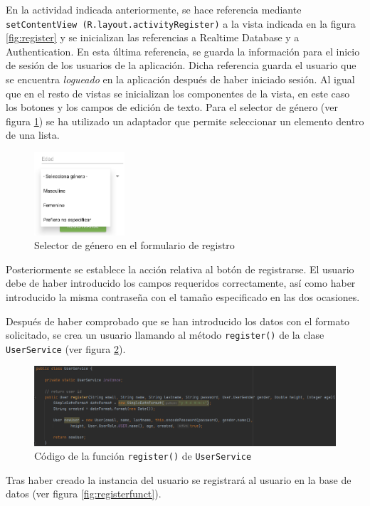 En la actividad indicada anteriormente, se hace referencia mediante \texttt{setContentView (R.layout.activityRegister)} a la vista indicada en la figura \ref{fig:register} y se inicializan las referencias a Realtime Database y a Authentication. En esta última referencia, se guarda la información para el inicio de sesión de los usuarios de la aplicación. Dicha referencia guarda el usuario que se encuentra \textit{logueado} en la aplicación después de haber iniciado sesión.
Al igual que en el resto de vistas se inicializan los componentes de la vista, en este caso los botones y los campos de edición de texto.
Para el selector de género (ver figura \ref{fig:selector}) se ha utilizado un adaptador que permite seleccionar un elemento dentro de una lista.
\begin{figure}[H]
    \centering
    \includegraphics[width=0.3\textwidth]{Images/Capitulo7/selector.png}
    \caption{Selector de género en el formulario de registro}
    \label{fig:selector}
\end{figure}
Posteriormente se establece la acción relativa al botón de registrarse. El usuario debe de haber introducido los campos requeridos correctamente, así como haber introducido la misma contraseña con el tamaño especificado en las dos ocasiones.

Después de haber comprobado que se han introducido los datos con el formato solicitado, se crea un usuario llamando al método \texttt{register()} de la clase \texttt{UserService} (ver figura \ref{fig:userservice}).

\begin{figure}[H]
    \centering
    \includegraphics[width=\textwidth]{Images/Capitulo7/userservice.png}
    \caption{Código de la función \texttt{register()} de \texttt{UserService}}
    \label{fig:userservice}
\end{figure}
Tras haber creado la instancia del usuario se registrará al usuario en la base de datos (ver figura \ref{fig:registerfunct}).

